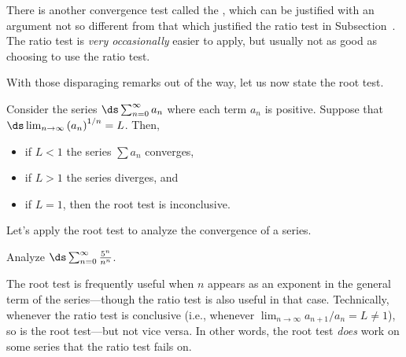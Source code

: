 There is another convergence test called the ,
which can be justified with an argument not so
different from that which justified the ratio test in
Subsection~.  The ratio test is
\textit{very occasionally} easier to apply, but usually not as good as
choosing to use the ratio test.

With those disparaging remarks out of the way, let us now state the
root test.

\begin{theorem} \label{thm:root test}
Consider the series $\ds\sum_{n=0}^\infty a_n$ where each term $a_n$ is positive.
Suppose that $\ds\lim_{n\to \infty} \left(a_n\right)^{1/n}=L$.  Then,
\begin{itemize}
\item if $L<1$ the series $\sum a_n$ converges, 
\item if $L>1$ the series diverges, and
\item if $L=1$, then the root test is inconclusive.
\end{itemize}
\end{theorem}

Let's apply the root test to analyze the convergence of a series.

\begin{example} Analyze $\ds\sum_{n=0}^\infty {5^n\over n^n}$.
\end{example}


The root test is frequently useful when $n$ appears as an exponent in
the general term of the series---though the ratio test is also useful
in that case.  Technically, whenever the ratio test is conclusive
(i.e., whenever $\lim_{n\to\infty} a_{n+1} / a_n = L \neq 1$), so is
the root test---but not vice versa.  In other words, the root test
\textit{does} work on some series that the ratio test fails on.

